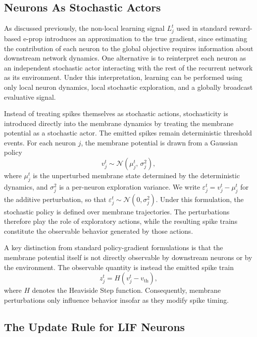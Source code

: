     \subsection{Neurons As Stochastic Actors}
    \label{subsec:neuron_as_actor}
    
    As discussed previously, the non-local learning signal $L_j^t$ used in standard
    reward-based e-prop introduces an approximation to the true gradient, since
    estimating the contribution of each neuron to the global objective requires
    information about downstream network dynamics.
    One alternative is to reinterpret each neuron as an independent stochastic
    actor interacting with the rest of the recurrent network as its environment.
    Under this interpretation, learning can be performed using only local neuron
    dynamics, local stochastic exploration, and a globally broadcast evaluative
    signal.
    
    Instead of treating spikes themselves as stochastic actions, stochasticity is
    introduced directly into the membrane dynamics by treating the membrane
    potential as a stochastic actor.
    The emitted spikes remain deterministic threshold events.
    For each neuron $j$, the membrane potential is drawn from a Gaussian policy
    \[
        v_j^t \sim \mathcal{N}(\mu_j^t,\, \sigma_j^2),
    \]
    where $\mu_j^t$ is the unperturbed membrane state determined by the
    deterministic dynamics, and $\sigma_j^2$ is a per-neuron exploration variance.
    We write $\varepsilon_j^t = v_j^t - \mu_j^t$ for the additive perturbation,
    so that $\varepsilon_j^t \sim \mathcal{N}(0, \sigma_j^2)$.
    Under this formulation, the stochastic policy is defined over membrane
    trajectories.
    The perturbations therefore play the role of exploratory actions, while the
    resulting spike trains constitute the observable behavior generated by those
    actions.
    
    A key distinction from standard policy-gradient formulations is that the
    membrane potential itself is not directly observable by downstream neurons or
    by the environment.
    The observable quantity is instead the emitted spike train
    \[
        z_j^t = H(v_j^t - v_{\mathrm{th}}),
    \]
    where $H$ denotes the Heaviside Step function.
    Consequently, membrane perturbations only influence behavior insofar as they
    modify spike timing.
    
    \subsection{The Update Rule for LIF Neurons}
    \label{subsec:lif_update_rule}
    
